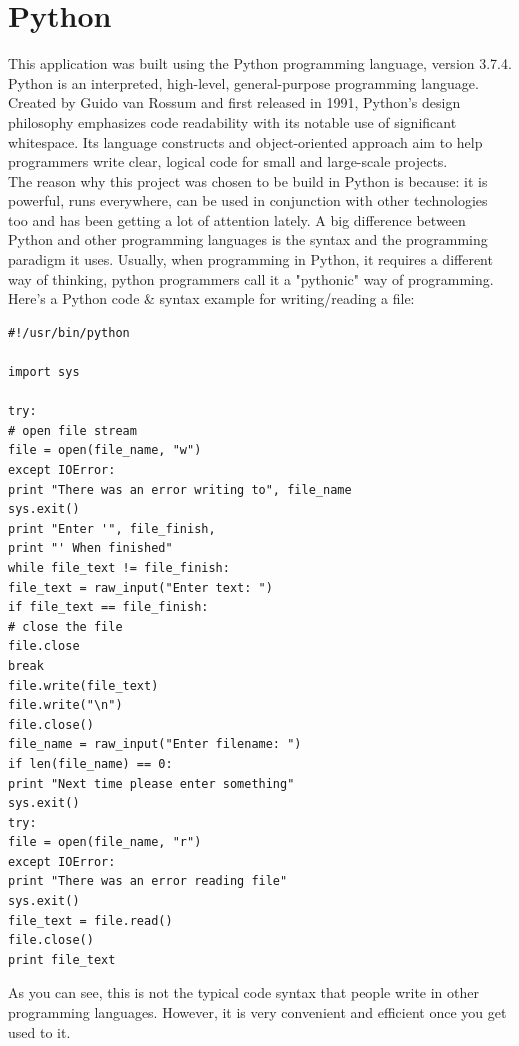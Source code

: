 \section{Python}
This application was built using the Python programming language, version 3.7.4.\\
\newline
Python is an interpreted, high-level, general-purpose programming language. Created by Guido van Rossum and first released in 1991, Python's design philosophy emphasizes code readability with its notable use of significant whitespace. Its language constructs and object-oriented approach aim to help programmers write clear, logical code for small and large-scale projects. \cite{WhatIsPython}\\
\newline
The reason why this project was chosen to be build in Python is because: it is powerful, runs everywhere, can be used in conjunction with other technologies too and has been getting a lot of attention lately.
A big difference between Python and other programming languages is the syntax and the programming paradigm it uses. Usually, when programming in Python, it requires a different way of thinking, python programmers call it a "pythonic" way of programming.\\
\newline
Here's a Python code \& syntax example for writing/reading a file:  \cite{PythonTutorialsPoint}
\begin{verbatim}
#!/usr/bin/python

import sys

try:
# open file stream
file = open(file_name, "w")
except IOError:
print "There was an error writing to", file_name
sys.exit()
print "Enter '", file_finish,
print "' When finished"
while file_text != file_finish:
file_text = raw_input("Enter text: ")
if file_text == file_finish:
# close the file
file.close
break
file.write(file_text)
file.write("\n")
file.close()
file_name = raw_input("Enter filename: ")
if len(file_name) == 0:
print "Next time please enter something"
sys.exit()
try:
file = open(file_name, "r")
except IOError:
print "There was an error reading file"
sys.exit()
file_text = file.read()
file.close()
print file_text
\end{verbatim}
As you can see, this is not the typical code syntax that people write in other programming languages. However, it is very convenient and efficient once you get used to it.\\
\newpage

